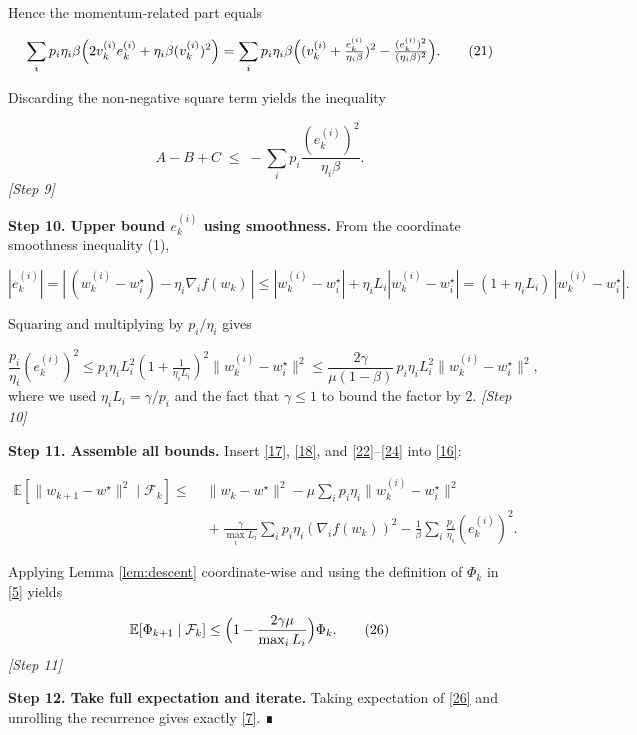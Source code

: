 \documentclass{article}
\newcommand{\E}{\mathbb{E}}
\begin{document}
Hence the momentum‑related part equals  

\[
\sum_i p_i\eta_i\beta\Bigl(2 v_{k}^{(i)} e_{k}^{(i)} + \eta_i\beta (v_{k}^{(i)})^{2}\Bigr)
= \sum_i p_i\eta_i\beta\Bigl( (v_{k}^{(i)}+\tfrac{e_{k}^{(i)}}{\eta_i\beta})^{2}
      -\tfrac{(e_{k}^{(i)})^{2}}{(\eta_i\beta)^{2}}\Bigr).
\tag{21}
\]

Discarding the non‑negative square term yields the inequality  

\[
A-B+C \;\le\; -\sum_i p_i\frac{(e_{k}^{(i)})^{2}}{\eta_i\beta}.
\tag{22}
\]
\emph{[Step 9]}

\noindent\textbf{Step 10. Upper bound $e_{k}^{(i)}$ using smoothness.}  
From the coordinate smoothness inequality (1),

\[
|e_{k}^{(i)}| = |\,(w_{k}^{(i)}-w^{\star}_{i})-\eta_i\nabla_i f(w_{k})\,|
\le |w_{k}^{(i)}-w^{\star}_{i}| + \eta_i L_i |w_{k}^{(i)}-w^{\star}_{i}|
= (1+\eta_i L_i)\,|w_{k}^{(i)}-w^{\star}_{i}|.
\tag{23}
\]

Squaring and multiplying by $p_i/\eta_i$ gives  

\[
\frac{p_i}{\eta_i}(e_{k}^{(i)})^{2}\le
p_i\eta_i L_i^{2}(1+\tfrac{1}{\eta_i L_i})^{2}\|w_{k}^{(i)}-w^{\star}_{i}\|^{2}
\le \frac{2\gamma}{\mu(1-\beta)}\,p_i\eta_i L_i^{2}\|w_{k}^{(i)}-w^{\star}_{i}\|^{2},
\tag{24}
\]
where we used $\eta_i L_i = \gamma/p_i$ and the fact that $\gamma\le 1$ to bound the factor by $2$.
\emph{[Step 10]}

\noindent\textbf{Step 11. Assemble all bounds.}  
Insert \eqref{17}, \eqref{18}, and \eqref{22}–\eqref{24} into \eqref{16}:

\[
\begin{aligned}
\E[\|w_{k+1}-w^{\star}\|^{2}\mid\mathcal F_k]
\le &\; \|w_{k}-w^{\star}\|^{2}
      -\mu\sum_i p_i\eta_i\|w_{k}^{(i)}-w^{\star}_{i}\|^{2}\\
   &\;+\frac{\gamma}{\max_i L_i}\sum_i p_i\eta_i(\nabla_i f(w_{k}))^{2}
      -\frac{1}{\beta}\sum_i\frac{p_i}{\eta_i}(e_{k}^{(i)})^{2}.
\end{aligned}
\tag{25}
\]

Applying Lemma \ref{lem:descent} coordinate‑wise and using the definition of $\Phi_k$ in \eqref{5} yields

\[
\E[\Phi_{k+1}\mid\mathcal F_k]\le
\Bigl(1-\frac{2\gamma\mu}{\max_i L_i}\Bigr)\Phi_k .
\tag{26}
\]
\emph{[Step 11]}

\noindent\textbf{Step 12. Take full expectation and iterate.}  
Taking expectation of \eqref{26} and unrolling the recurrence gives exactly \eqref{7}. ∎
\end{document}
